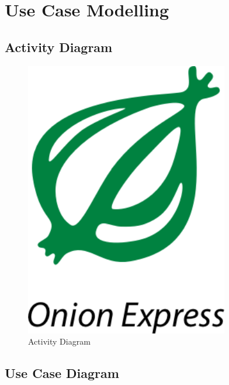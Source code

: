 \documentclass[12pt]{scrreprt}
\begin{document}
\chapter{Use Case Modelling}
\section{Activity Diagram}
\begin{figure}[htbp]
  \centering\includegraphics[width=3.5in]{DocumentRes/OnionExpress.png}
  \caption{Activity Diagram}
\end{figure}
\section{Use Case Diagram}
\end{document}
